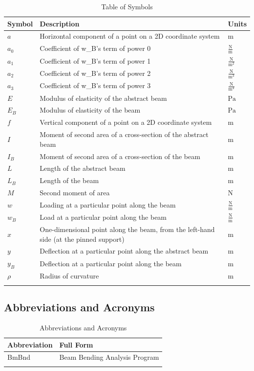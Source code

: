 \documentclass[12pt]{article}
\begin{document}
\begin{longtabu}{l X[l] l}
\toprule
\textbf{Symbol} & \textbf{Description} & \textbf{Units}
\\
\midrule
\endhead
$a$ & Horizontal component of a point on a 2D coordinate system & ${\text{m}}$
\\
${a_{\text{0}}}$ & Coefficient of w\_B's term of power 0 & $\frac{\text{N}}{\text{m}}$
\\
${a_{\text{1}}}$ & Coefficient of w\_B's term of power 1 & $\frac{\text{N}}{\text{m}^{2}}$
\\
${a_{\text{2}}}$ & Coefficient of w\_B's term of power 2 & $\frac{\text{N}}{\text{m}^{3}}$
\\
${a_{\text{3}}}$ & Coefficient of w\_B's term of power 3 & $\frac{\text{N}}{\text{m}^{4}}$
\\
$E$ & Modulus of elasticity of the abstract beam & ${\text{Pa}}$
\\
${E_{B}}$ & Modulus of elasticity of the beam & ${\text{Pa}}$
\\
$f$ & Vertical component of a point on a 2D coordinate system & ${\text{m}}$
\\
$I$ & Moment of second area of a cross-section of the abstract beam & ${\text{m}}$
\\
${I_{B}}$ & Moment of second area of a cross-section of the beam & ${\text{m}}$
\\
$L$ & Length of the abstract beam & ${\text{m}}$
\\
${L_{B}}$ & Length of the beam & ${\text{m}}$
\\
$M$ & Second moment of area & ${\text{N}}$
\\
$w$ & Loading at a particular point along the beam & $\frac{\text{N}}{\text{m}}$
\\
${w_{B}}$ & Load at a particular point along the beam & $\frac{\text{N}}{\text{m}}$
\\
$x$ & One-dimensional point along the beam, from the left-hand side (at the pinned support) & ${\text{m}}$
\\
$y$ & Deflection at a particular point along the abstract beam & ${\text{m}}$
\\
${y_{B}}$ & Deflection at a particular point along the beam & ${\text{m}}$
\\
$ρ$ & Radius of curvature & ${\text{m}}$
\\
\bottomrule
\caption{Table of Symbols}
\label{Table:ToS}
\end{longtabu}
\subsection{Abbreviations and Acronyms}
\label{Sec:TAbbAcc}
\begin{longtable}{l l}
\toprule
\textbf{Abbreviation} & \textbf{Full Form}
\\
\midrule
\endhead
BmBnd & Beam Bending Analysis Program
\\
\bottomrule
\caption{Abbreviations and Acronyms}
\label{Table:TAbbAcc}
\end{longtable}
\end{document}
